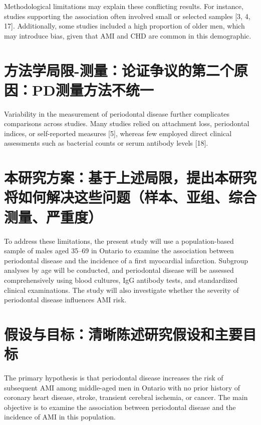\documentclass[fontset=fandol]{ctexart}
\begin{document}
Methodological limitations may explain these conflicting results. For instance, studies supporting the association often involved small or selected samples [3, 4, 17]. Additionally, some studies included a high proportion of older men, which may introduce bias, given that AMI and CHD are common in this demographic.

\section{方法学局限-测量：论证争议的第二个原因：PD测量方法不统一}

Variability in the measurement of periodontal disease further complicates comparisons across studies. Many studies relied on attachment loss, periodontal indices, or self-reported measures [5], whereas few employed direct clinical assessments such as bacterial counts or serum antibody levels [18].

\section{本研究方案：基于上述局限，提出本研究将如何解决这些问题（样本、亚组、综合测量、严重度）}

To address these limitations, the present study will use a population-based sample of males aged 35–69 in Ontario to examine the association between periodontal disease and the incidence of a first myocardial infarction. Subgroup analyses by age will be conducted, and periodontal disease will be assessed comprehensively using blood cultures, IgG antibody tests, and standardized clinical examinations. The study will also investigate whether the severity of periodontal disease influences AMI risk.

 \section{假设与目标：清晰陈述研究假设和主要目标}

The primary hypothesis is that periodontal disease increases the risk of subsequent AMI among middle-aged men in Ontario with no prior history of coronary heart disease, stroke, transient cerebral ischemia, or cancer. The main objective is to examine the association between periodontal disease and the incidence of AMI in this population.
	
\end{document}
